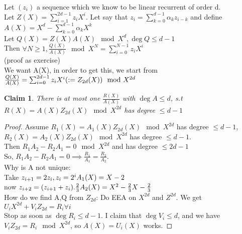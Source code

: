 \documentclass{article}
\newtheorem{claim}{Claim}
\theoremstyle{definition}
\theoremstyle{remark}
\begin{document}
Let $(z_i)$ a sequence which we know to be linear recurrent of order d.\\
Let $Z(X) = \sum_{i = 1}^{2d - 1} z_i X^i$.
Let say that $z_i = \sum_{k = 0}^{d - 1}\alpha_k z_{i-k}$ and define $A(X) = X^d - \sum_{k= 0}^{d-1}\alpha_k X^k$\\
Let $Q(X) = Z(X)A(X) \mod X^d, \deg Q \leq d - 1$\\
Then $\forall N \geq 1, \frac{Q(X)}{A(X)} \mod X^N = \sum_{i = 0}^{N -1}z_i X^i$\\
(proof as exercise)\\

We want A(X), in order to get this, we start from $\frac{Q(X)}{A(X)} = \sum_{i = 0}^{2d - 1}z_i X^i\\(:= Z_{2d}(X)) \mod X^{2d}$

\begin{claim}
	There is at most one $\frac{R(X)}{A(X)}$ with $\deg A \leq d$, s.t $R(X) = A(X) Z_{2d}(X) \mod X^{2d}$ has degree $\leq d-1$
\end{claim}
\begin{proof}
Assume $R_1(X) = A_1(X)Z_{2d}(X) \mod X^{2d}$ has degree $\leq d-1$,\\
$R_2(X) = A_2(X)Z_{2d}(X) \mod X^{2d}$ has degree $\leq d-1$.\\
Then $R_1A_2 -R_2A_1 = 0 \mod X^{2d}$ and has degree $\leq 2d -1$\\
So, $R_1A_2 -R_2A_1 = 0 \implies \frac{R_1}{A_1} = \frac{R_2}{A_2}$.\\

Why is A not unique:\\
Take $z_{i+1} = 2z_i, z_i = 2^i\\A_1(X) = X - 2$\\
now $z_{i+2} = (z_{i+1} + z_i).\frac{2}{3}\\A_2(X) = X^2 - \frac{2}{3}X - \frac{2}{3}$\\

How do we find A,Q from $Z_{2d}$:
Do EEA on $X^{2d}$ and $Z^{2d}$. We get $U_i X^{2d} + V_i Z_{2d} = R_i \forall i$\\
Stop as soon as $\deg R_i \leq d-1$. I claim that $\deg V_i \leq d$, and we have $V_i Z_{2d} = R_i \mod X^{2d}$, so $A(X) = U_i(X)$ works.
\end{proof}
\end{document}
